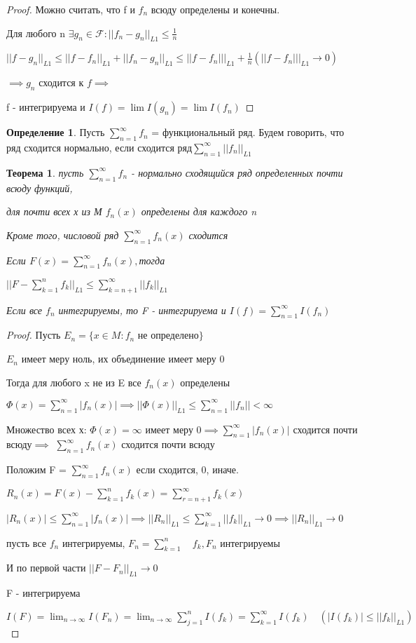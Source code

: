 \documentclass[a4paper, 12pt]{article}
\newtheorem{theorem}{Теорема}[section]
\theoremstyle{definition}
\newtheorem*{definition}{Определение}
\theoremstyle{remark}
\begin{document}
\begin{proof}
     Можно считать, что f и $f_n$ всюду определены и конечны.

     Для любого n $\exists g_n\in\mathcal{F} : ||f_n-g_n||_{L1}\leq \frac{1}{n}$

     $||f - g_n||_{L1}\leq ||f-f_n||_{L1} + ||f_n- g_n||_{L1}\leq ||f-f_n|||_{L1}+\frac{1}{n} (||f-f_n|||_{L1}\to 0)$

     $\implies g_n$ сходится к $f \implies$

     f - интегрируема и $I(f) = \lim I(g_n) = \lim I(f_n)$
\end{proof}
\begin{definition}
     Пусть $\sum_{n = 1}^{\infty} f_n$ = функциональный ряд. Будем говорить, что ряд сходится нормально, если сходится ряд$\sum_{n = 1}^{\infty} ||f_n||_{L1}  $
\end{definition}
\begin{theorem}
     пусть $\sum_{n = 1}^{\infty} f_n$ - нормально сходящийся ряд определенных почти всюду функций,

     для почти всех х из М $f_n(x)$ определены для каждого n

     Кроме того, числовой ряд $\sum_{n = 1}^{\infty} f_n(x)$ сходится

     Если $F(x)=\sum_{n = 1}^{\infty} f_n(x), $тогда

     $||F - \sum_{k =1}^{n} f_k ||_{L1}\leq \sum_{k = n+ 1}^{\infty} ||f_k||_{L1} $

     Если все $f_n$ интегрируемы, то F - интегрируема и 
     $I(f) = \sum_{n = 1}^{\infty} I(f_n) $
\end{theorem}
\begin{proof}
     Пусть $E_n = \{x\in M : f_n$ не определено$\}$
     
     $E_n$ имеет меру ноль, их объединение имеет меру 0

     Тогда для любого x не из E все $f_n(x)$ определены
     
     $\Phi(x) =\sum_{n = 1}^{\infty} |f_n(x)| \implies ||\Phi(x)||_{L1}\leq \sum_{n = 1}^{\infty} ||f_n|| < \infty$

     Множество всех х: $\Phi(x)=\infty$ имеет меру $0\implies\sum_{n = 1}^{\infty} |f_n(x)|$ сходится почти всюду$\implies$
     $\sum_{n = 1}^{\infty} f_n(x)$ сходится почти всюду

     Положим F = $\sum_{n = 1}^{\infty} f_n(x)$ если сходится, 0, иначе.

     $R_n(x) = F(x) - \sum_{k = 1}^{n} f_k(x)  = \sum_{r = n+1}^{\infty}  f_k(x)$

     $|R_n(x)|\leq \sum_{n = 1}^{\infty} |f_n(x)|\implies ||R_n||_{L1}\leq \sum_{k = 1}^{\infty} ||f_k||_{L1}\to 0\implies ||R_n||_{L1} \to 0$
     
     пусть все $f_n$ интегрируемы, $F_n =\sum_{k = 1}^{n}\quad  f_k, F_n$ интегрируемы
     
     И по первой части $||F- F_n||_{L1} \to 0$

     F - интегрируема 

     $I(F) = \lim_{n\to \infty} I(F_n)= \lim_{n\to\infty}\sum_{j = 1}^{n} I(f_k) = \sum_{k = 1}^{\infty} I(f_k) \quad(|I(f_k)|\leq ||f_k||_{L1}) $
\end{proof}
\end{document}
